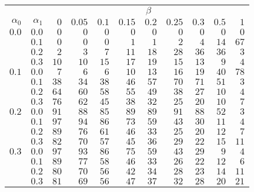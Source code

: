 \begin{tabular}{rr|rrrrrrrrr}
\hline\hline
 && \multicolumn{9}{c}{$\beta$}\\
 $\alpha_0$ & $\alpha_1$ & $0$ & $0.05$ & $0.1$ & $0.15$ & $0.2$ & $0.25$ & $0.3$ & $0.5$ & $1$ \\ 
 \hline
$0.0$ & $0.0$ & $0$ & $0$ & $0$ & $0$ & $0$ & $0$ & $0$ & $0$ & $0$\\ 
 & $0.1$ & $0$ & $0$ & $0$ & $1$ & $1$ & $2$ & $4$ & $14$ & $67$\\ 
 & $0.2$ & $2$ & $3$ & $7$ & $11$ & $18$ & $28$ & $36$ & $36$ & $3$\\ 
 & $0.3$ & $10$ & $10$ & $15$ & $17$ & $19$ & $15$ & $13$ & $9$ & $4$\\ 
\hline 
 $0.1$ & $0.0$ & $7$ & $6$ & $6$ & $10$ & $13$ & $16$ & $19$ & $40$ & $78$\\ 
 & $0.1$ & $38$ & $34$ & $38$ & $46$ & $57$ & $70$ & $71$ & $51$ & $3$\\ 
 & $0.2$ & $64$ & $60$ & $58$ & $55$ & $49$ & $38$ & $27$ & $10$ & $4$\\ 
 & $0.3$ & $76$ & $62$ & $45$ & $38$ & $32$ & $25$ & $20$ & $10$ & $7$\\ 
\hline 
 $0.2$ & $0.0$ & $91$ & $88$ & $85$ & $89$ & $89$ & $91$ & $88$ & $52$ & $3$\\ 
 & $0.1$ & $97$ & $94$ & $86$ & $73$ & $59$ & $43$ & $30$ & $11$ & $4$\\ 
 & $0.2$ & $89$ & $76$ & $61$ & $46$ & $33$ & $25$ & $20$ & $12$ & $7$\\ 
 & $0.3$ & $82$ & $70$ & $57$ & $45$ & $36$ & $29$ & $22$ & $15$ & $11$\\ 
\hline 
 $0.3$ & $0.0$ & $97$ & $93$ & $86$ & $75$ & $59$ & $43$ & $29$ & $9$ & $4$\\ 
 & $0.1$ & $89$ & $77$ & $58$ & $46$ & $33$ & $26$ & $22$ & $12$ & $6$\\ 
 & $0.2$ & $80$ & $70$ & $56$ & $42$ & $34$ & $28$ & $23$ & $14$ & $11$\\ 
 & $0.3$ & $81$ & $69$ & $56$ & $47$ & $37$ & $32$ & $28$ & $20$ & $21$\\ 
 \hline 
 \end{tabular}